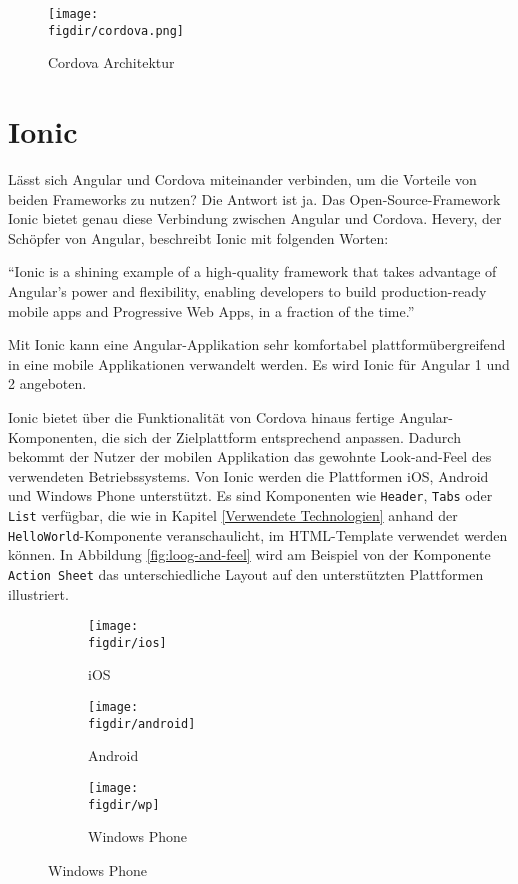 \begin{figure}[htb]
\centering
\caption{Cordova Architektur \cite{cordova}}
\label{fig:cordova}
\texttt{[image: \\figdir/cordova.png]}
\end{figure}

\section{Ionic}

Lässt sich Angular und Cordova miteinander verbinden, um die Vorteile von beiden Frameworks zu nutzen? Die Antwort ist ja. Das Open-Source-Framework Ionic bietet genau diese Verbindung zwischen Angular und Cordova. Hevery, der Schöpfer von Angular, beschreibt Ionic mit folgenden Worten:

\begin{citeenv}
	``Ionic is a shining example of a high-quality framework that takes advantage of Angular's power and flexibility, enabling developers to build production-ready mobile apps and Progressive Web Apps, in a fraction of the time.'' \cite{ionic:qutation}
\end{citeenv}


Mit Ionic kann eine Angular-Applikation sehr komfortabel plattformübergreifend in eine mobile Applikationen verwandelt werden. Es wird Ionic für Angular 1 und 2 angeboten.

Ionic bietet über die Funktionalität von Cordova hinaus fertige Angular-Komponenten, die sich der Zielplattform entsprechend anpassen. Dadurch bekommt der Nutzer der mobilen Applikation das gewohnte Look-and-Feel des verwendeten Betriebssystems. Von Ionic werden die Plattformen iOS, Android und Windows Phone unterstützt. Es sind Komponenten wie \texttt{Header}, \texttt{Tabs} oder \texttt{List} verfügbar, die wie in Kapitel \ref{Verwendete Technologien} anhand der \texttt{HelloWorld}-Komponente veranschaulicht, im HTML-Template verwendet werden können. In Abbildung \ref{fig:loog-and-feel} wird am Beispiel von der Komponente \texttt{Action Sheet} das unterschiedliche Layout auf den unterstützten Plattformen illustriert.

\begin{figure}[htb]
\centering
\caption{Look-and-feel von Ionic auf verschiedenen Plattformen am Beispiel von Action Sheets}
\label{fig:loog-and-feel}
\begin{subfigure}{0.32\textwidth}
\texttt{[image: \\figdir/ios]}
\caption{iOS}
\end{subfigure}
\begin{subfigure}{0.32\textwidth}
\texttt{[image: \\figdir/android]}
\caption{Android}
\end{subfigure}
\begin{subfigure}{0.32\textwidth}
\texttt{[image: \\figdir/wp]}
\caption{Windows Phone}
\end{subfigure}
\end{figure}

